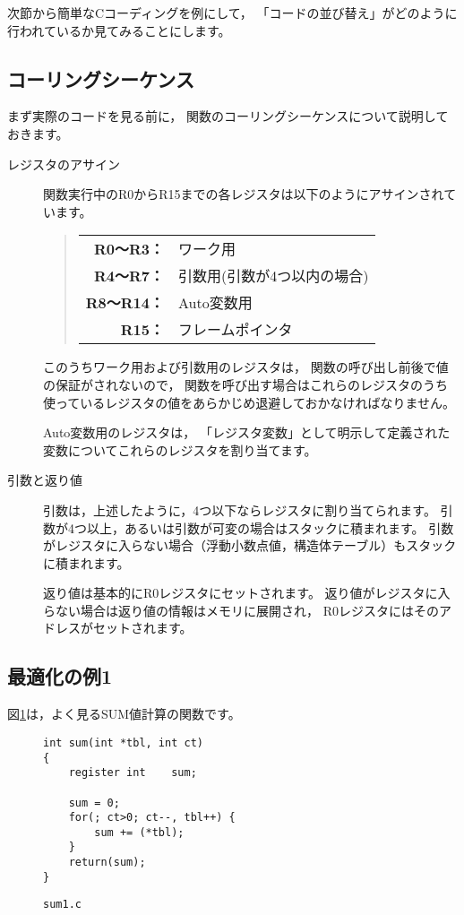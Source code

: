 \documentclass[a4j,10pt,fleqn]{jsarticle}
\begin{document}
次節から簡単なCコーディングを例にして，
「コードの並び替え」がどのように行われているか見てみることにします。


\subsection{コーリングシーケンス}

まず実際のコードを見る前に，
関数のコーリングシーケンスについて説明しておきます。

\begin{description}

\item[レジスタのアサイン]
関数実行中のR0からR15までの各レジスタは以下のようにアサインされています。
\begin{quote}\begin{tabular}{rl}
\textbf{R0～R3：}  & ワーク用 \\
\textbf{R4～R7：}  & 引数用(引数が4つ以内の場合) \\
\textbf{R8～R14：} & Auto変数用 \\
\textbf{R15：}     & フレームポインタ \\
\end{tabular}\end{quote}
\par このうちワーク用および引数用のレジスタは，
関数の呼び出し前後で値の保証がされないので，
関数を呼び出す場合はこれらのレジスタのうち
使っているレジスタの値をあらかじめ退避しておかなければなりません。
\par Auto変数用のレジスタは，
「レジスタ変数」として明示して定義された変数についてこれらのレジスタを割り当てます。

\item[引数と返り値]
引数は，上述したように，4つ以下ならレジスタに割り当てられます。
引数が4つ以上，あるいは引数が可変の場合はスタックに積まれます。
引数がレジスタに入らない場合（浮動小数点値，構造体テーブル）もスタックに積まれます。
\par 返り値は基本的にR0レジスタにセットされます。
返り値がレジスタに入らない場合は返り値の情報はメモリに展開され，
R0レジスタにはそのアドレスがセットされます。

\end{description}


\subsection{最適化の例1} \label{sec:exsample1}

図\ref{fig:sum1.c}は，よく見るSUM値計算の関数です。
\begin{figure}[tpb]
\begin{boxnote}
{\small\begin{verbatim}
int sum(int *tbl, int ct)
{
    register int    sum;

    sum = 0;
    for(; ct>0; ct--, tbl++) {
        sum += (*tbl);
    }
    return(sum);
}
\end{verbatim}}
\end{boxnote}
\caption{\texttt{sum1.c}} \label{fig:sum1.c}
\end{figure}
\end{document}
